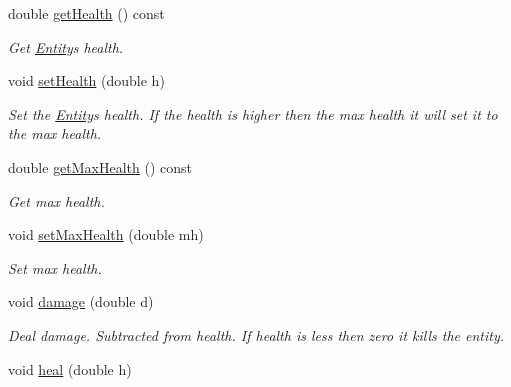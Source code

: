 \begin{DoxyCompactItemize}
\item 
double \hyperlink{classEntity_a19c16788d1361e72ac26abb48c7d760f}{get\+Health} () const \hypertarget{classEntity_a19c16788d1361e72ac26abb48c7d760f}{}\label{classEntity_a19c16788d1361e72ac26abb48c7d760f}

\begin{DoxyCompactList}\small\item\em Get \hyperlink{classEntity}{Entity}\textquotesingle{}s health. \end{DoxyCompactList}\item 
void \hyperlink{classEntity_a4f521d321ea874c474cc0506ff78da08}{set\+Health} (double h)\hypertarget{classEntity_a4f521d321ea874c474cc0506ff78da08}{}\label{classEntity_a4f521d321ea874c474cc0506ff78da08}

\begin{DoxyCompactList}\small\item\em Set the \hyperlink{classEntity}{Entity}\textquotesingle{}s health. If the health is higher then the max health it will set it to the max health. \end{DoxyCompactList}\item 
double \hyperlink{classEntity_a5db2ad1ad9e13953207fec9786e632ca}{get\+Max\+Health} () const \hypertarget{classEntity_a5db2ad1ad9e13953207fec9786e632ca}{}\label{classEntity_a5db2ad1ad9e13953207fec9786e632ca}

\begin{DoxyCompactList}\small\item\em Get max health. \end{DoxyCompactList}\item 
void \hyperlink{classEntity_a375385b808ac7fd4632d6b71f15b0e1c}{set\+Max\+Health} (double mh)\hypertarget{classEntity_a375385b808ac7fd4632d6b71f15b0e1c}{}\label{classEntity_a375385b808ac7fd4632d6b71f15b0e1c}

\begin{DoxyCompactList}\small\item\em Set max health. \end{DoxyCompactList}\item 
void \hyperlink{classEntity_af7fb432e778f9fcfe4584d09b6a73294}{damage} (double d)\hypertarget{classEntity_af7fb432e778f9fcfe4584d09b6a73294}{}\label{classEntity_af7fb432e778f9fcfe4584d09b6a73294}

\begin{DoxyCompactList}\small\item\em Deal damage. Subtracted from health. If health is less then zero it kills the entity. \end{DoxyCompactList}\item 
void \hyperlink{classEntity_aef00fa78f66829c0ecb8c27c65bd3a92}{heal} (double h)\hypertarget{classEntity_aef00fa78f66829c0ecb8c27c65bd3a92}{}\label{classEntity_aef00fa78f66829c0ecb8c27c65bd3a92}


\end{DoxyCompactItemize}
